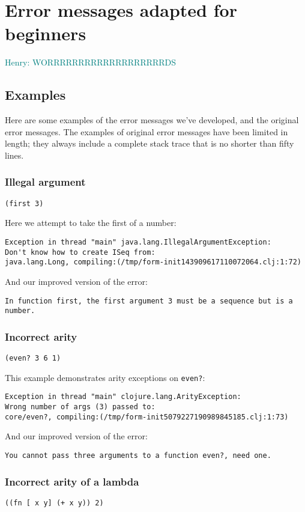 \documentclass[submission,copyright,creativecommons]{eptcs}
\newcommand{\allcomments}[1]{{#1}}
\newcommand{\hfcomment}[1]{\textcolor{Teal}{\allcomments{Henry: {#1}}}}
\begin{document}
\section{Error messages adapted for beginners}\label{sec:errors-work}
\hfcomment{WORRRRRRRRRRRRRRRRRRRDS}

\subsection{Examples}
Here are some examples of the error messages we've developed, and the original error messages. 
The examples of original error messages have been limited in length; they always include a complete stack trace that is no shorter than fifty lines.

\subsubsection{Illegal argument}
{\tt (first 3)}

Here we attempt to take the first of a number:
\begin{verbatim}
Exception in thread "main" java.lang.IllegalArgumentException:
Don't know how to create ISeq from:
java.lang.Long, compiling:(/tmp/form-init143909617110072064.clj:1:72)
\end{verbatim}


And our improved version of the error:
\begin{verbatim}
In function first, the first argument 3 must be a sequence but is a number.
\end{verbatim}

\subsubsection{Incorrect arity}
{\tt (even? 3 6 1)}

This example demonstrates arity exceptions on \texttt{even?}:
\begin{verbatim}
Exception in thread "main" clojure.lang.ArityException:
Wrong number of args (3) passed to:
core/even?, compiling:(/tmp/form-init5079227190989845185.clj:1:73)
\end{verbatim}
And our improved version of the error:
\begin{verbatim}
You cannot pass three arguments to a function even?, need one.
\end{verbatim}

\subsubsection{Incorrect arity of a lambda}
{\tt ((fn [ x y] (+ x y)) 2)}
\end{document}
